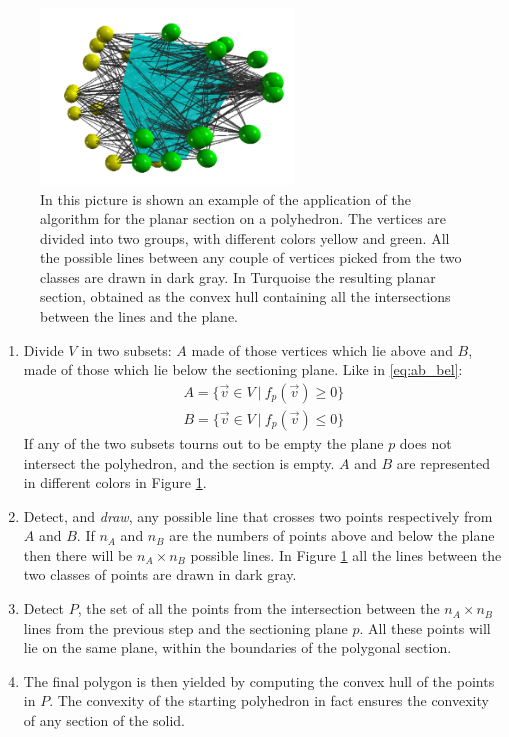 \documentclass[12pt,a4paper]{report}
\begin{document}
    \begin{figure}
        \centering
        \includegraphics[width = 0.6\textwidth]{images/sec_pol}
        \caption{In this picture is shown an example of the application of the algorithm for the planar section on a polyhedron. The vertices are divided into two groups, with different colors yellow and green. All the possible lines between any couple of vertices picked from the two classes are drawn in dark gray. In Turquoise the resulting planar section, obtained as the convex hull containing all the intersections between the lines and the plane.}
        \label{fig:sec_pol}
    \end{figure}

    \begin{enumerate}
        \item Divide $V$ in two subsets: $A$ made of those vertices which lie above and $B$, made of those which lie below the sectioning plane. Like in \ref{eq:ab_bel}:
        \begin{align}
            A = \{ \vec v \in V \ |\ f_p(\vec v)\geq 0\} \label{eq:ab_bel} \\
            B = \{ \vec v \in V \ |\ f_p(\vec v)\leq 0\} \nonumber
        \end{align}
        If any of the two subsets tourns out to be empty the plane $p$ does not intersect the polyhedron, and the section is empty. $A$ and $B$ are represented in different colors in Figure \ref{fig:sec_pol}.

        \item Detect, and \textit{draw}, any possible line that crosses two points respectively from $A$ and $B$. If $n_A$ and $n_B$ are the numbers of points above and below the plane then there will be $n_A \times n_B$ possible lines. In Figure \ref{fig:sec_pol} all the lines between the two classes of points are drawn in dark gray.

        \item Detect $P$, the set of all the points from the intersection between the $n_A \times n_B$ lines from the previous step and the sectioning plane $p$. All these points will lie on the same plane, within the boundaries of the polygonal section.

        \item The final polygon is then yielded by computing the convex hull of the points in $P$. The convexity of the starting polyhedron in fact ensures the convexity of any section of the solid.
    \end{enumerate}
\end{document}
